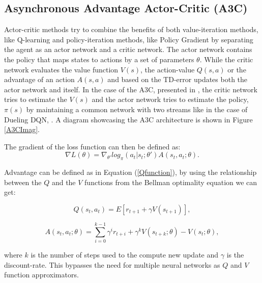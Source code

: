 \subsection{Asynchronous Advantage Actor-Critic (A3C)}
\noindent Actor-critic methods try to combine the benefits of both value-iteration methods, like Q-learning and policy-iteration methods, like Policy Gradient by separating the agent as an actor network and a critic network. The actor network contains the policy that maps states to actions by a set of parameters $\theta$. While the critic network evaluates the value function $V(s)$, the action-value $Q(s,a)$ or the advantage of an action $A(s,a)$ and based on the \acrshort{TD}-error updates both the actor network and itself. In the case of the \acrshort{A3C}, presented in \cite{a3c}, the critic network tries to estimate the $V(s)$ and the actor network tries to estimate the policy, $\pi(s)$ by maintaining a common network with two streams like in the case of \acrshort{Dueling DQN}, \cite{duelingDQN}. A diagram showcasing the A3C architecture is shown in Figure \ref{A3CImag}.

The gradient of the loss function can then be defined as:
\begin{equation}
    \nabla L(\theta) = \nabla_{\theta'} log_\pi(a_t|s_t; \theta')A(s_t, a_t; \theta) .
\end{equation}

Advantage can be defined as in Equation (\ref{Qfunction}), by using the relationship between the $Q$ and the $V$ functions from the Bellman optimality equation we can get:

\begin{equation}
    Q(s_t, a_t) = E[r_{t+1} + \gamma V(s_{t+1})] ,
\end{equation}

\begin{equation}
    A(s_t, a_t; \theta) = \sum\limits_{i=0}^{k-1} \gamma^i r_{t+i} + \gamma^k V(s_{t+k}; \theta) - V(s_t;\theta),
\end{equation}

where $k$ is the number of steps used to the compute new update and $\gamma$ is the discount-rate. This bypasses the need for multiple neural networks as $Q$ and $V$ function approximators.

